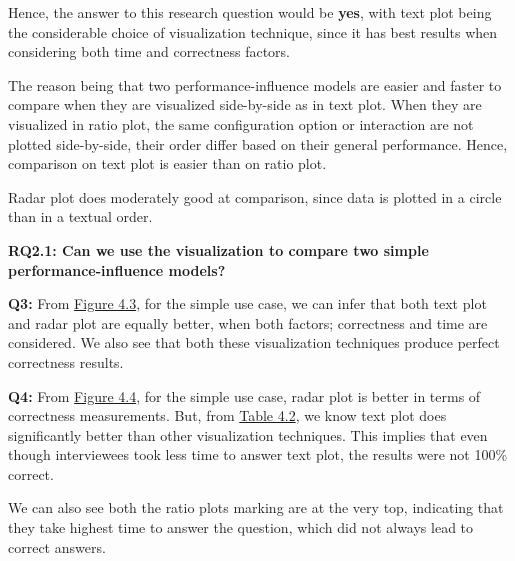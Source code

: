 Hence, the answer to this research question would be \textbf{yes}, with text plot being the considerable choice of visualization technique, since it has best results when considering both time and correctness factors.

The reason being that two performance-influence models are easier and faster to compare when they are visualized side-by-side as in text plot. When they are visualized in ratio plot, the same configuration option or interaction are not plotted side-by-side, their order differ based on their general performance. Hence, comparison on text plot is easier than on ratio plot. 

Radar plot does moderately good at comparison, since data is plotted in a circle than in a textual order.

\vskip 0.2in
\begin{mdframed}
\textbf{RQ2.1: Can we use the visualization to compare two simple performance-influence models?}
\end{mdframed}

\textbf{Q3:} From \hyperref[figure:paretoTwoQ3]{Figure 4.3}, for the simple use case, we can infer that both text plot and radar plot are equally better, when both factors; correctness and time are considered. We also see that both these visualization techniques produce perfect correctness results.

\textbf{Q4:} From \hyperref[figure:paretoTwoQ4]{Figure 4.4}, for the simple use case, radar plot is better in terms of correctness measurements. But, from \hyperref[table:time]{Table 4.2}, we know text plot does significantly better than other visualization techniques. This implies that even though interviewees took less time to answer text plot, the results were not 100\% correct.

We can also see both the ratio plots marking are at the very top, indicating that they take highest time to answer the question, which did not always lead to correct answers.

